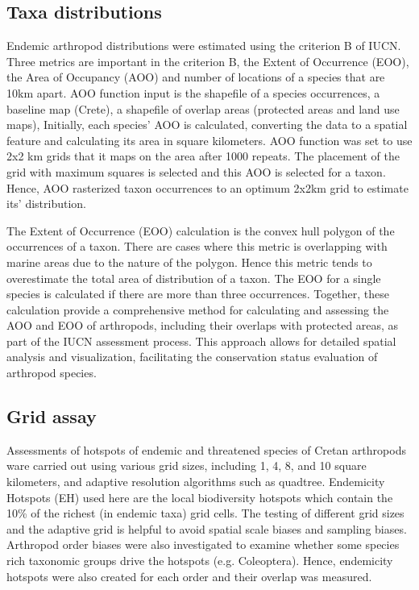     \subsection{Taxa distributions}
    \label{subsec:arthropods-eoo-aoo}

Endemic arthropod distributions were estimated using the criterion B of IUCN. 
Three metrics are important in the criterion B, the Extent of Occurrence (EOO),
the Area of Occupancy (AOO) and 
number of locations of a species that are 10km apart.
AOO function input is the shapefile of a species occurrences,
a baseline map (Crete), a shapefile of overlap areas (protected areas and land use maps),
Initially, each species' AOO is calculated, converting the data to a spatial feature
and calculating its area in square kilometers. 
AOO function was set to use 2x2 km grids that it maps on the area after 1000
repeats. The placement of the grid with maximum squares is selected and this AOO 
is selected for a taxon. Hence, AOO rasterized taxon occurrences to an optimum 
2x2km grid to estimate its' distribution.

The Extent of Occurrence (EOO) calculation is the convex hull polygon of the occurrences 
of a taxon. There are cases where this metric is overlapping with marine areas due 
to the nature of the polygon. Hence this metric tends to overestimate the 
total area of distribution of a taxon.
The EOO for a single species is calculated if there are more than three occurrences.
Together, these calculation provide a comprehensive method for calculating and
assessing the AOO and EOO of arthropods, including their overlaps with protected
areas, as part of the IUCN assessment process. This approach allows for detailed
spatial analysis and visualization, facilitating the conservation status evaluation of arthropod species.


    \subsection{Grid assay}
    \label{subsec:arthropods-ehs-kbas}

Assessments of hotspots of endemic and threatened species of Cretan arthropods
ware carried out using various grid sizes, including 1, 4, 8, and 10 square kilometers, and
adaptive resolution algorithms such as quadtree. 
Endemicity Hotspots (EH) used here are the local biodiversity hotspots which contain
the 10\% of the richest (in endemic taxa) grid cells.
The testing of different grid sizes and the adaptive grid is helpful to avoid 
spatial scale biases and sampling biases.
Arthropod order biases were also investigated to examine whether some species
rich taxonomic groups drive the hotspots (e.g. Coleoptera). Hence, endemicity 
hotspots were also created for each order and their overlap was measured.

